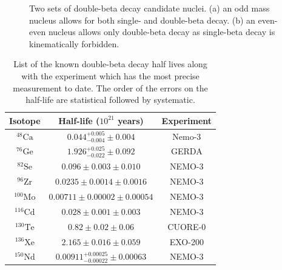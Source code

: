 \begin{figure}[htbp]
\begin{subfigure}[t]{0.40\textwidth}
\caption{}
\label{fig:parabola_even}
\end{subfigure}
\caption[Two sets of double-beta decay candidate nuclei]
{Two sets of double-beta decay candidate nuclei.
(a) an odd mass nucleus allows for both single- and double-beta decay.
(b) an even-even nucleus allows only double-beta decay as single-beta decay is kinematically forbidden.}
\label{fig:parabola_evenodd}
\end{figure}


\begin{table}[H]
\centering
\begin{tabular}{ccc}
\hline \hline
Isotope & Half-life ($10^{21}$ years) & Experiment \\ \hline 
$^{48}\textrm{Ca}$ & $0.044^{+0.005}_{-0.004} \pm 0.004$ \cite{Bongrand:2011ei} & Nemo-3 \\
$^{76}\textrm{Ge}$ & $1.926^{+0.025}_{-0.022} \pm 0.092$ \cite{Agostini:2015nwa} & GERDA  \\
$^{82}\textrm{Se}$ & $0.096 \pm 0.003 \pm 0.010$ \cite{Bongrand:2011ei} & NEMO-3 \\ 
$^{96}\textrm{Zr}$ & $0.0235 \pm 0.0014 \pm 0.0016$ \cite{Bongrand:2011ei} & NEMO-3 \\ 
$^{100}\textrm{Mo}$ & $0.00711 \pm 0.00002 \pm 0.00054$ \cite{Bongrand:2011ei} & NEMO-3 \\ 
$^{116}\textrm{Cd}$ & $0.028 \pm 0.001 \pm 0.003$ \cite{Bongrand:2011ei} & NEMO-3 \\ 
$^{130}\textrm{Te}$ & $0.82 \pm 0.02\pm 0.06$ \cite{Alduino:2016vtd} & CUORE-0 \\
$^{136}\textrm{Xe}$ & $2.165 \pm 0.016 \pm 0.059$ \cite{Albert:2013gpz} & EXO-200 \\
$^{150}\textrm{Nd}$ & $0.00911^{+0.00025}_{-0.00022}\pm 0.00063$ \cite{Bongrand:2011ei} & NEMO-3 \\
\hline \hline
\end{tabular} 
\caption[List of known two-neutrino beta decay half lives]
{List of the known double-beta decay half lives along with the experiment which has the most precise measurement to date.
The order of the errors on the half-life are statistical followed by systematic.}
\label{tab:2nuHalfLife}
\end{table}
